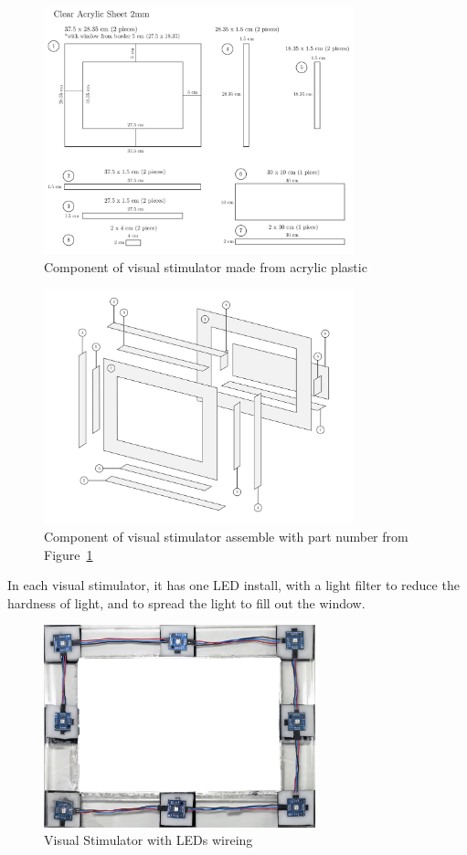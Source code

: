 \begin{figure}[ht]
	\centering
	\includegraphics[width=0.8\textwidth]{chapter6/sch.pdf}
	\caption{Component of visual stimulator made from acrylic plastic}
	\label{fig:sch}
\end{figure}

\begin{figure}[ht]
	\centering
	\includegraphics[width=0.8\textwidth]{chapter6/component.pdf}
	\caption{Component of visual stimulator assemble with part number from Figure~\ref{fig:sch} }
\end{figure}

In each visual stimulator, it has one LED install, with a light filter to reduce the hardness of light, and to spread the light to fill out the window.
\begin{figure}[ht]
	\centering
	\includegraphics[width=0.7\textwidth]{chapter6/frame_LED.jpg}
	\caption{Visual Stimulator with LEDs wireing}
\end{figure}

